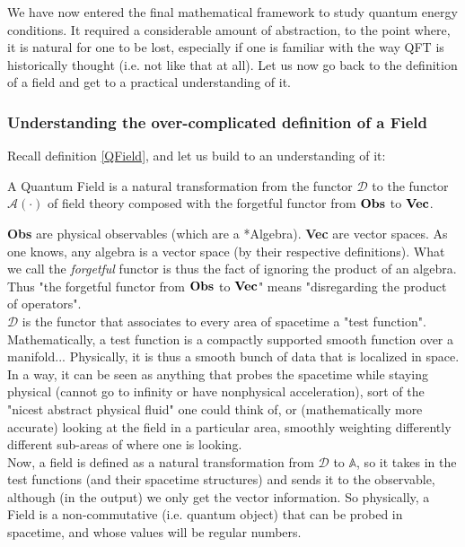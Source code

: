 \documentclass[a4paper,11pt]{article}
\numberwithin{equation}{section}
\theoremstyle{definition}
\begin{document}
We have now entered the final mathematical framework to study quantum energy conditions. It required a considerable amount of abstraction, to the point where, it is natural for one to be lost, especially if one is familiar with the way QFT is historically thought (i.e. not like that at all). Let us now go back to the definition of a field and get to a practical understanding of it.
\subsubsection{Understanding the over-complicated definition of a Field}
Recall definition \ref{QField}, and let us build to an understanding of it:
\begin{center}
    A Quantum Field is a natural transformation from the functor $\mathcal{D}$ to the functor $\mathcal{A}(\cdot)$ of field theory composed with the forgetful functor from $\bold{Obs}$ to $\bold{Vec}$.
\end{center}
\textbf{Obs} are physical observables (which are a *Algebra). \textbf{Vec} are vector spaces. As one knows, any algebra is a vector space (by their respective definitions). What we call the \emph{forgetful} functor is thus the fact of ignoring the product of an algebra. Thus "the forgetful functor from $\bold{Obs}$ to $\bold{Vec}$" means "disregarding the product of operators".\\

$\mathcal{D}$ is the functor that associates to every area of spacetime a "test function". Mathematically, a test function is a compactly supported smooth function over a manifold... Physically, it is thus a smooth bunch of data that is localized in space. In a way, it can be seen as anything that probes the spacetime while staying physical (cannot go to infinity or have nonphysical acceleration), sort of the "nicest abstract physical fluid" one could think of, or (mathematically more accurate) looking at the field in a particular area, smoothly weighting differently different sub-areas of where one is looking.\\

Now, a field is defined as a natural transformation from $\mathcal{D}$ to $\mathbb{A}$, so it takes in the test functions (and their spacetime structures) and sends it to the observable, although (in the output) we only get the vector information. So physically, a Field is a non-commutative (i.e. quantum object) that can be probed in spacetime, and whose values will be regular numbers.\\
\end{document}
